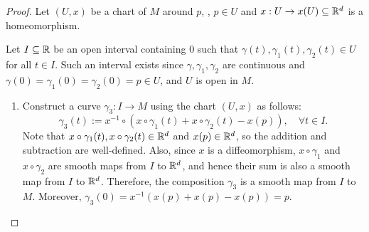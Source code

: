 \begin{proof}
	Let \((U, x)\) be a chart of \(M\) around \(p\), \ie, \(p \in U\) and \(x: U \to x(U) \subseteq \mathbb R^d\) is a homeomorphism.

	Let \(I \subseteq \mathbb R\) be an open interval containing \(0\) such that \(\gamma(t), \gamma_1(t), \gamma_2(t) \in U\) for all \(t \in I\). Such an interval exists since \(\gamma, \gamma_1, \gamma_2\) are continuous and \(\gamma(0) = \gamma_1(0) = \gamma_2(0) = p \in U\), and \(U\) is open in \(M\).
	\begin{enumerate}
		\item Construct a curve \(\gamma_3: I \to M\) using the chart \((U, x)\) as follows:
		      \begin{equation}
			      \gamma_3(t) := x^{-1} \circ (x \circ \gamma_1(t) + x \circ \gamma_2(t) - x(p)), \quad \forall t \in I.
		      \end{equation}
		      Note that \(x \circ \gamma_1(t), x \circ \gamma_2(t) \in \mathbb R^d\) and \(x(p) \in \mathbb R^d\), so the addition and subtraction are well-defined. Also, since \(x\) is a diffeomorphism, \(x \circ \gamma_1\) and \(x \circ \gamma_2\) are smooth maps from \(I\) to \(\mathbb R^d\), and hence their sum is also a smooth map from \(I\) to \(\mathbb R^d\). Therefore, the composition \(\gamma_3\) is a smooth map from \(I\) to \(M\). Moreover, \(\gamma_3(0) = x^{-1}(x(p) + x(p) - x(p)) = p\).


\end{enumerate}
\end{proof}
